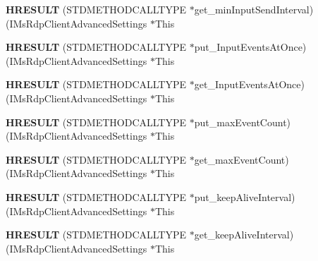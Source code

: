 \begin{DoxyCompactItemize}
{\bfseries H\+R\+E\+S\+U\+LT} (S\+T\+D\+M\+E\+T\+H\+O\+D\+C\+A\+L\+L\+T\+Y\+PE $\ast$get\+\_\+min\+Input\+Send\+Interval)(I\+Ms\+Rdp\+Client\+Advanced\+Settings $\ast$This
\item 
\mbox{\label{struct_i_ms_rdp_client_advanced_settings_vtbl_ad4206bfaea514d8c54233653eed4e5b8}} 
{\bfseries H\+R\+E\+S\+U\+LT} (S\+T\+D\+M\+E\+T\+H\+O\+D\+C\+A\+L\+L\+T\+Y\+PE $\ast$put\+\_\+\+Input\+Events\+At\+Once)(I\+Ms\+Rdp\+Client\+Advanced\+Settings $\ast$This
\item 
\mbox{\label{struct_i_ms_rdp_client_advanced_settings_vtbl_aa6ee6e4ebe543422ffa1688bf6d97c9a}} 
{\bfseries H\+R\+E\+S\+U\+LT} (S\+T\+D\+M\+E\+T\+H\+O\+D\+C\+A\+L\+L\+T\+Y\+PE $\ast$get\+\_\+\+Input\+Events\+At\+Once)(I\+Ms\+Rdp\+Client\+Advanced\+Settings $\ast$This
\item 
\mbox{\label{struct_i_ms_rdp_client_advanced_settings_vtbl_aa6abd60e1cda16ce5560b940b05a0da0}} 
{\bfseries H\+R\+E\+S\+U\+LT} (S\+T\+D\+M\+E\+T\+H\+O\+D\+C\+A\+L\+L\+T\+Y\+PE $\ast$put\+\_\+max\+Event\+Count)(I\+Ms\+Rdp\+Client\+Advanced\+Settings $\ast$This
\item 
\mbox{\label{struct_i_ms_rdp_client_advanced_settings_vtbl_a164e82b7e5bfa9e01ef08e146d66e129}} 
{\bfseries H\+R\+E\+S\+U\+LT} (S\+T\+D\+M\+E\+T\+H\+O\+D\+C\+A\+L\+L\+T\+Y\+PE $\ast$get\+\_\+max\+Event\+Count)(I\+Ms\+Rdp\+Client\+Advanced\+Settings $\ast$This
\item 
\mbox{\label{struct_i_ms_rdp_client_advanced_settings_vtbl_a4460d60ee001ca847b973507bf7842ea}} 
{\bfseries H\+R\+E\+S\+U\+LT} (S\+T\+D\+M\+E\+T\+H\+O\+D\+C\+A\+L\+L\+T\+Y\+PE $\ast$put\+\_\+keep\+Alive\+Interval)(I\+Ms\+Rdp\+Client\+Advanced\+Settings $\ast$This
\item 
\mbox{\label{struct_i_ms_rdp_client_advanced_settings_vtbl_a3371216033cc75887c33ca4834f0984e}} 
{\bfseries H\+R\+E\+S\+U\+LT} (S\+T\+D\+M\+E\+T\+H\+O\+D\+C\+A\+L\+L\+T\+Y\+PE $\ast$get\+\_\+keep\+Alive\+Interval)(I\+Ms\+Rdp\+Client\+Advanced\+Settings $\ast$This
\item 

\end{DoxyCompactItemize}
